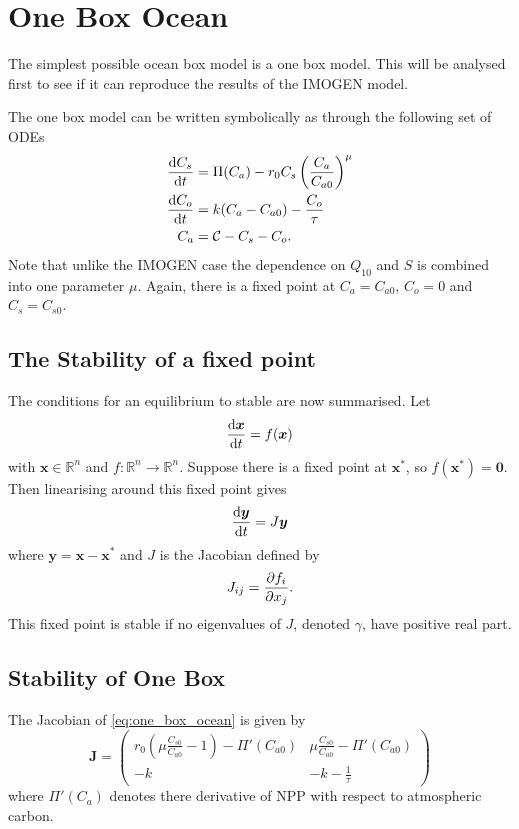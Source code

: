 \section{One Box Ocean}
The simplest possible ocean box model is a one box model. This will be analysed first to see if it can reproduce the results of the IMOGEN model.

The one box model can be written symbolically as through the following set of ODEs
\begin{subequations}
  \label{eq:one_box_ocean}
  \begin{align}
    \dv{C_s}{t} &= \Pi(C_a) - r_0 C_s \left(\frac{C_a}{C_{a0}}\right)^{\mu} \\
    \dv{C_o}{t} &= k(C_a - C_{a0}) - \frac{C_o}{\tau} \\
    C_a &= \mathcal{C} - C_s - C_o.
\end{align}
\end{subequations}
Note that unlike the IMOGEN case the dependence on $Q_{10}$ and $S$ is combined into one parameter $\mu$. Again, there is a fixed point at
$C_a = C_{a0}$, $C_o = 0$ and $C_s = C_{s0}$.
\subsection{The Stability of a fixed point}
The conditions for an equilibrium to stable are now summarised. Let
\begin{equation}
  \label{eq:generic_system}
  \dv{\bm{x}}{t} = f(\bm{x})
\end{equation}
with $\bm{x} \in \mathbb{R}^n$ and $f: \mathbb{R}^n \rightarrow \mathbb{R}^n$. Suppose there is a fixed point at $\bm{x}^*$, so $f(\bm{x}^*) = \bm{0}$. Then linearising around this
fixed point gives
\begin{equation}
  \label{eq:generic_system_linearised}
  \dv{\bm{y}}{t} = J\bm{y}
\end{equation}
where $\bm{y} = \bm{x} - \bm{x}^*$ and $J$ is the Jacobian defined by
\begin{equation}
  \label{eq:generic_jacobian}
  J_{ij} = \pdv{f_i}{x_j}.
\end{equation}
This fixed point is stable if no eigenvalues of $J$, denoted $\gamma$, have positive real part.
\subsection{Stability of One Box}
The Jacobian of \cref{eq:one_box_ocean} is given by
\begin{equation}
  \label{eq:jacobian_of_one_box}
    \bm{J} = 
    \begin{pmatrix}
    r_0 \left( \mu \frac{C_{s0}}{C_{a0}} - 1\right) - \Pi'(C_{a0}) & 
    \mu \frac{C_{s0}}{C_{a0}} - \Pi'(C_{a0}) \\
    -k & -k - \frac{1}{\tau}
    \end{pmatrix}
  \end{equation}
where $\Pi'(C_a)$ denotes there derivative of NPP with respect to atmospheric carbon.
  
